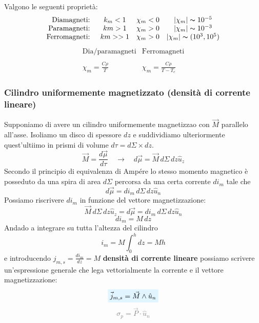 \documentclass[x11names]{report}
\newcommand{\viola}[1]{%
	\colorbox{myblue}{$\displaystyle #1$}
}
\begin{document}
Valgono le seguenti proprietà:
\[
\begin{array}{rccc}
	\text{Diamagneti: } & k_m < 1 & \chi_m < 0 & |\chi_m| \thicksim 10^{-5}\\
	\text{Paramagneti: } & km > 1 & \chi_m > 0 & |\chi_m| \thicksim 10^{-3} \\
	\text{Ferromagneti: }& km >> 1 & \chi_m > 0 & |\chi_m| \thicksim (10^{3},10^{5})\\
\end{array}
\]
\[
\begin{array}{cc}
	\text{Dia/paramagneti} & \text{Ferromagneti} \\ & \\
	\chi_m = \frac{C\rho}{T} & \chi_m = \frac{C\rho}{T-T_c}
\end{array}
\]

\subsubsection{Cilindro uniformemente magnetizzato (densità di corrente lineare)}
Supponiamo di avere un cilindro uniformemente magnetizzao con \(\vec{M}\) parallelo all'asse. Isoliamo un disco di spessore \(dz\) e suddividiamo ulteriormente quest'ultiimo in prismi di volume \(d\tau = d\Sigma \times dz\).
\[
\vec{M} = \frac{d\vec{\mu}}{d\tau} \quad \to \quad d\vec{\mu} = \vec{M} \, d\Sigma \, dz \hat{u}_z
\]
Secondo il principio di equivalenza di Ampére lo stesso momento magnetico è posseduto da una spira di area \(d\Sigma\) percorsa da una certa corrente \(di_m\) tale che 
\[
d\vec{\mu} = di_m \, d\Sigma \, dz \hat{u}_n 
\]
Possiamo riscrivere \(di_m\) in funzione del vettore magnetizzazione:
\[
\vec{M} \, d\Sigma \, dz \hat{u}_z=d\vec{\mu} = di_m \, d\Sigma \, dz \hat{u}_n 
\]
\[
di_m = M \, dz
\]
Andado a integrare su tutta l'altezza del cilindro
\[
i_m = M \int_{0}^{h} dz = Mh
\]
e introducendo \(j_{m,s} = \frac{di_m}{dz} = M\) \textbf{densità di corrente lineare} possiamo scrivere un'espressione generale che lega vettorialmente la corrente e il vettore magnetizzazione:
\begin{equation}
	\viola{\vec{j}_{m,s} = \vec{M}\wedge\hat{u}_n} 
\end{equation}
\vspace{-0.4cm}
 \textcolor{gray}{\[
\sigma_p = \vec{P}\cdot\hat{u}_n
\]}
\end{document}

